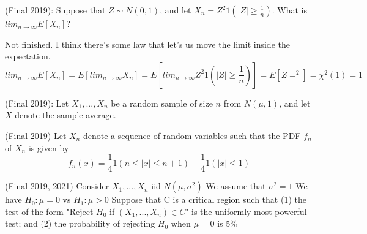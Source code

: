 \documentclass[answers]{exam}
\begin{document}
\begin{questions}
\question (Final 2019): Suppose that $Z \sim N(0,1)$, and let $X_n = Z^2 1(|Z|\geq \frac{1}{n})$. What is $lim_{n \to \infty} E[X_n]$?
\begin{solution} 
    Not finished. I think there's some law that let's us move the limit inside the expectation.
    $$lim_{n \to \infty} E[X_n] = E[lim_{n \to \infty} X_n] = E[lim_{n \to \infty} Z^2 1(|Z|\geq \frac{1}{n})] = E[Z =^2] = \chi^2(1) = 1$$
\end{solution}

\question (Final 2019): Let $X_1,...,X_n$ be a random sample of size $n$ from $N(\mu,1)$, and let $\bar{X}$ denote the sample average.

\question (Final 2019) Let $X_n$ denote a sequence of random variables such that the PDF $f_n$ of $X_n$ is given by
$$f_n(x)=\frac{1}{4}1(n \leq |x| \leq n + 1) + \frac{1}{4}1(|x|\leq 1)$$

\question (Final 2019, 2021) Consider $X_1,...,X_n$ iid $N(\mu,\sigma^2)$ We assume that $\sigma^2 = 1$ We have $H_0 : \mu = 0$ vs $H_1 : \mu > 0$ Suppose that C is a critical region such that (1) the test of the form "Reject $H_0$ if $(X_1,...,X_n) \in C$" is the uniformly most powerful test; and (2) the probability of rejecting $H_0$ when $\mu = 0$ is 5\%
\begin{parts}

\end{parts}
\end{questions}
\end{document}
